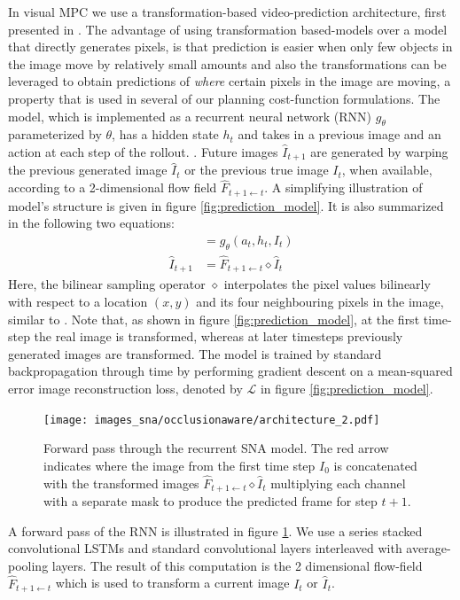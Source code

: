 In visual MPC we use a transformation-based video-prediction architecture, first presented in \cite{finn_nips}. The advantage of using transformation based-models over a model that directly generates pixels, is that prediction is easier when only few objects in the image move by relatively small amounts and also the transformations can be leveraged to obtain predictions of \emph{where} certain pixels in the image are moving, a property that is used in several of our planning cost-function formulations. The model, which is implemented as a recurrent neural network (RNN) $g_{\theta}$ parameterized by $\theta$, has a hidden state $h_t$ and takes in a previous image and an action at each step of the rollout. . Future images $\hat{I}_{t+1}$ are generated by warping the previous generated image $\hat{I}_t$ or the previous true image $I_t$, when available, according to a 2-dimensional flow field $\hat{F}_{t+1 \leftarrow t}$. A simplifying illustration of model's structure is given in figure \ref{fig:prediction_model}. It is also summarized in the following two equations:
\begin{align}
[h_{t+1}, \hat{F}_{t+1 \leftarrow t}] 	&= g_{\theta}(a_t, h_t, I_t) \\
\hat{I}_{t+1} 							&= \hat{F}_{t+1 \leftarrow t} \diamond  \hat{I}_t 
\label{simple_dna}
\end{align}
Here, the bilinear sampling operator $\diamond$ interpolates the pixel values bilinearly with respect to a location $(x,y)$ and its four neighbouring pixels in the image, similar to \cite{zhou2016view}. Note that, as shown in figure \ref{fig:prediction_model}, at the first time-step the real image is transformed, whereas at later timesteps previously generated images are transformed. The model is trained by standard backpropagation through time
by performing gradient descent on a mean-squared error image reconstruction loss, denoted by $\mathcal{L}$ in figure \ref{fig:prediction_model}.
\begin{figure}[t]
    \centering
    \texttt{[image: images\_sna/occlusionaware/architecture\_2.pdf]}
    \caption{\small{Forward pass through the recurrent SNA model. The red arrow indicates where the image from the first time step $I_0$ is concatenated with the transformed images $\hat{F}_{t+1 \leftarrow t} \diamond  \hat{I}_t $ multiplying each channel with a separate mask to produce the predicted frame for step $t+1$.}}      \label{fig:occlusion_model}
\end{figure}
A forward pass of the RNN is illustrated in figure \ref{fig:occlusion_model}. We use a series stacked convolutional LSTMs and standard convolutional layers interleaved with average-pooling layers. The result of this computation is the 2 dimensional flow-field $\hat{F}_{t+1 \leftarrow t}$ which is used to transform a current image $I_t$ or $\hat{I}_t$.


